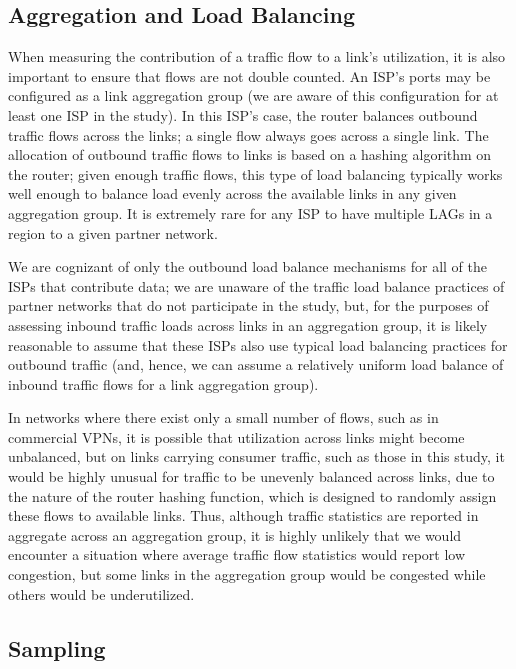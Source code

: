 \subsection{Aggregation and Load Balancing}\label{sec:aggregation}
When measuring the contribution of a traffic flow to a link's utilization,
it is also important to ensure that flows are not double counted. An
ISP's ports may be configured as a link aggregation group (we are aware
of this configuration for at least one ISP in the study).  In this ISP's case,
the router balances outbound traffic flows across the links; a single
flow always goes across a single link. The allocation of outbound
traffic flows to links is based on a hashing algorithm on the router;
given enough traffic flows, this type of load balancing typically works
well enough to balance load evenly across the available links in any
given aggregation group.  It is extremely rare for any ISP
to have multiple LAGs in a region to a given partner network.

We are cognizant of only the outbound load balance mechanisms for all of
the ISPs that contribute data; we are unaware of the traffic load
balance practices of partner networks that do not participate in the study, but, for
the purposes of assessing inbound traffic loads across links in an
aggregation group, it is likely reasonable to assume that these ISPs
also use typical load balancing practices for outbound traffic (and,
hence, we can assume a relatively uniform load balance of inbound
traffic flows for a link aggregation group). 

In networks where there exist only a small number of flows, such as in
commercial VPNs, it is possible that utilization across links might
become unbalanced, but on links carrying consumer traffic, such as those
in this study, it would be highly unusual for traffic to be unevenly
balanced across links, due to the nature of the router hashing function,
which is designed to randomly assign these flows to available links.
Thus, although traffic statistics are reported in aggregate across an
aggregation group, it is highly unlikely that we would encounter a
situation where average traffic flow statistics would report low
congestion, but some links in the aggregation group would be congested
while others would be underutilized. 

\subsection{Sampling}


